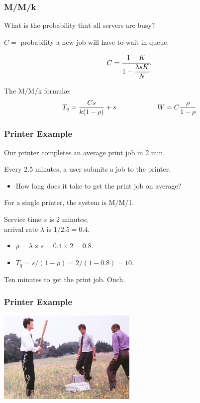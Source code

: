 \begin{frame}
\frametitle{M/M/k}

\large
\begin{changemargin}{1.5cm}
What is the probability that all servers are busy? 

$C = $ probability a new job will have to wait in queue.

\[
	C = \cfrac{1 - K}{1 - \dfrac{\lambda s K}{N}}.\]

The M/M/k formul\ae: \\[0em]

\[ T_{q} = \dfrac{C s}{k(1 - \rho)} + s \mbox{\qquad\qquad\qquad} W = C \dfrac{\rho}{1 - \rho} \]
\end{changemargin}

\end{frame}


\begin{frame}
\frametitle{Printer Example}

\large
\begin{changemargin}{1.5cm}
Our printer completes an average print job in 2 min. 

Every 2.5 minutes, a user submits a job to the printer. 

\begin{itemize}
\item How long does it take to get the print job on average? 
\end{itemize}

For a single printer, the system is M/M/1. 

Service time $s$ is 2 minutes; \\
arrival rate $\lambda$ is $1/2.5 = 0.4$. 

\begin{itemize}
\item $\rho = \lambda \times s = 0.4 \times 2 = 0.8$. 
\item $T_{q} = s / (1 - \rho ) = 2 / (1 -0.8 ) = 10$. 
\end{itemize}

Ten minutes to get the print job. Ouch.
\end{changemargin}

\end{frame}

\begin{frame}
\frametitle{Printer Example}

\begin{center}
	\includegraphics[width=0.5\textwidth]{images/printer.jpg}
\end{center}


\end{frame}

